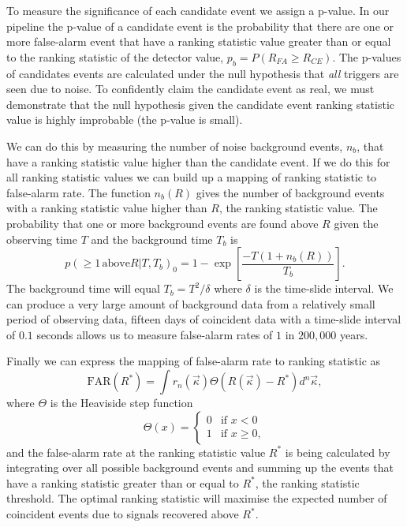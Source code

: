 To measure the significance of each candidate event we assign a p-value. In our pipeline the p-value of a candidate event is the probability that there are one or more false-alarm event that have a ranking statistic value greater than or equal to the ranking statistic of the detector value, $p_{b} = P(R_{FA} \ge R_{CE})$. The p-values of candidates events are calculated under the null hypothesis that \textit{all} triggers are seen due to noise. To confidently claim the candidate event as real, we must demonstrate that the null hypothesis given the candidate event ranking statistic value is highly improbable (the p-value is small).

We can do this by measuring the number of noise background events, $n_{b}$, that have a ranking statistic value higher than the candidate event. If we do this for all ranking statistic values we can build up a mapping of ranking statistic to false-alarm rate. The function $n_{b}(R)$ gives the number of background events with a ranking statistic value higher than $R$, the ranking statistic value. The probability that one or more background events are found above $R$ given the observing time $T$ and the background time $T_{b}$ is~\cite{PyCBC:2016}
%
\begin{equation}
    p(\ge 1 \, \text{above} R|T, T_{b})_{0} = 1 - \exp \left[\frac{-T(1 + n_{b}(R))}{T_{b}}\right].
\end{equation}
%
The background time will equal $T_{b} = T^{2}/\delta$ where $\delta$ is the time-slide interval. We can produce a very large amount of background data from a relatively small period of observing data, fifteen days of coincident data with a time-slide interval of $0.1$ seconds allows us to measure false-alarm rates of $1$ in $200,000$ years.

Finally we can express the mapping of false-alarm rate to ranking statistic as
%
\begin{equation}
    \text{FAR}(R^{*}) = \int r_{n}(\vec{\kappa}) \Theta(R(\vec{\kappa}) - R^{*}) d^{n}\vec{\kappa},
    \label{2:eq:far_mapping}
\end{equation}
%
where $\Theta$ is the Heaviside step function
%
\begin{equation}
    \Theta(x) =
    \begin{cases} 
        0 & \text{if } x < 0 \\
        1 & \text{if } x \geq 0,
    \end{cases}
\end{equation}
%
and the false-alarm rate at the ranking statistic value $R^{*}$ is being calculated by integrating over all possible background events and summing up the events that have a ranking statistic greater than or equal to $R^{*}$, the ranking statistic threshold. The optimal ranking statistic will maximise the expected number of coincident events due to signals recovered above $R^{*}$.

